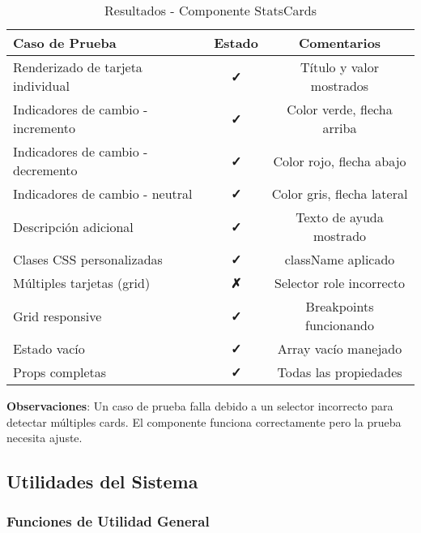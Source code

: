 \documentclass[12pt,a4paper]{article}
\begin{document}
\begin{table}[H]
\centering
\caption{Resultados - Componente StatsCards}
\begin{tabular}{@{}p{6cm}cc@{}}
\toprule
\textbf{Caso de Prueba} & \textbf{Estado} & \textbf{Comentarios} \\
\midrule
Renderizado de tarjeta individual & \textcolor{successgreen}{\textbf{✓}} & Título y valor mostrados \\
Indicadores de cambio - incremento & \textcolor{successgreen}{\textbf{✓}} & Color verde, flecha arriba \\
Indicadores de cambio - decremento & \textcolor{successgreen}{\textbf{✓}} & Color rojo, flecha abajo \\
Indicadores de cambio - neutral & \textcolor{successgreen}{\textbf{✓}} & Color gris, flecha lateral \\
Descripción adicional & \textcolor{successgreen}{\textbf{✓}} & Texto de ayuda mostrado \\
Clases CSS personalizadas & \textcolor{successgreen}{\textbf{✓}} & className aplicado \\
Múltiples tarjetas (grid) & \textcolor{dangerred}{\textbf{✗}} & Selector role incorrecto \\
Grid responsive & \textcolor{successgreen}{\textbf{✓}} & Breakpoints funcionando \\
Estado vacío & \textcolor{successgreen}{\textbf{✓}} & Array vacío manejado \\
Props completas & \textcolor{successgreen}{\textbf{✓}} & Todas las propiedades \\
\bottomrule
\end{tabular}
\end{table}

\textbf{Observaciones}: Un caso de prueba falla debido a un selector incorrecto para detectar múltiples cards. El componente funciona correctamente pero la prueba necesita ajuste.

\subsection{Utilidades del Sistema}

\subsubsection{Funciones de Utilidad General}
\end{document}
